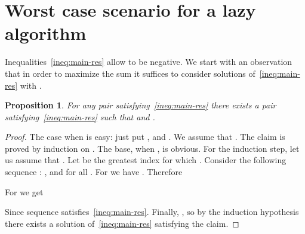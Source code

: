 \documentclass[12pt]{amsart}
\newtheorem{prop}[theorem]{Proposition}
\theoremstyle{definition}
\begin{document}
\section{Worst case scenario for a lazy algorithm}
\label{sect:worst_adapive}
Inequalities~\eqref{ineq:main-res} allow  to be negative. 
We start with an observation
that in order to maximize the sum  it suffices 
to consider solutions of~\eqref{ineq:main-res} with .

\begin{prop}\label{prop:positiv:x0}
For any pair  satisfying~\eqref{ineq:main-res} there exists a pair  
satisfying~\eqref{ineq:main-res} such that  and .
\end{prop}
\begin{proof}
The case when  is easy: 
just put ,  and .
We assume that . 
The claim is proved by induction on .
The base, when , is obvious.
For the induction step, let us assume that .
Let  be the greatest index for which .
Consider the following sequence : ,  and  for all .
For  we have .
Therefore 

For   we get

Since  sequence  satisfies~\eqref{ineq:main-res}.
Finally, , so by the induction hypothesis 
there exists a solution of~\eqref{ineq:main-res} satisfying the claim.
\end{proof}
\end{document}
